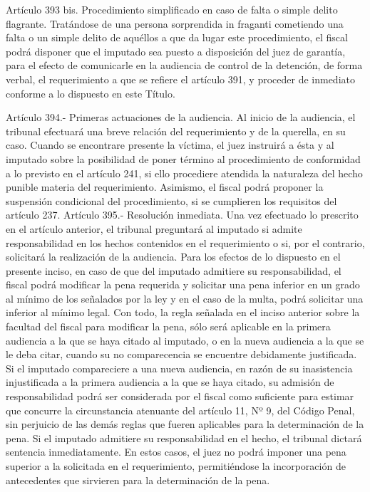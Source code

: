     Artículo 393 bis. Procedimiento simplificado en caso de falta o simple delito flagrante. Tratándose de una persona sorprendida in fraganti cometiendo una falta o un simple delito de aquéllos a que da lugar este procedimiento, el fiscal podrá disponer que el imputado sea puesto a disposición del juez de garantía, para el efecto de comunicarle en la audiencia de control de la detención, de forma verbal, el requerimiento a que se refiere el artículo 391, y proceder de inmediato conforme a lo dispuesto en este Título.

    Artículo 394.- Primeras actuaciones de la audiencia. Al inicio de la audiencia, el tribunal efectuará una breve relación del requerimiento y de la querella, en su caso. Cuando se encontrare presente la víctima, el juez instruirá a ésta y al imputado sobre la posibilidad de poner término al procedimiento de conformidad a lo previsto en el artículo 241, si ello procediere atendida la naturaleza del hecho punible materia del requerimiento. Asimismo, el fiscal podrá proponer la suspensión condicional del procedimiento, si se cumplieren los requisitos del artículo 237.
    Artículo 395.- Resolución inmediata. Una vez efectuado lo prescrito en el artículo anterior, el tribunal preguntará al imputado si admite responsabilidad en los hechos contenidos en el requerimiento o si, por el contrario, solicitará la realización de la audiencia. Para los efectos de lo dispuesto en el presente inciso, en caso de que del imputado admitiere su responsabilidad, el fiscal podrá modificar la pena requerida y solicitar una pena inferior en un grado al mínimo de los señalados por la ley y en el caso de la multa, podrá solicitar una inferior al mínimo legal.
    Con todo, la regla señalada en el inciso anterior sobre la facultad del fiscal para modificar la pena, sólo será aplicable en la primera audiencia a la que se haya citado al imputado, o en la nueva audiencia a la que se le deba citar, cuando su no comparecencia se encuentre debidamente justificada.
    Si el imputado compareciere a una nueva audiencia, en razón de su inasistencia injustificada a la primera audiencia a la que se haya citado, su admisión de responsabilidad podrá ser considerada por el fiscal como suficiente para estimar que concurre la circunstancia atenuante del artículo 11, Nº 9, del Código Penal, sin perjuicio de las demás reglas que fueren aplicables para la determinación de la pena.
    Si el imputado admitiere su responsabilidad en el hecho, el tribunal dictará sentencia inmediatamente. En estos casos, el juez no podrá imponer una pena superior a la solicitada en el requerimiento, permitiéndose la incorporación de antecedentes que sirvieren para la determinación de la pena.



